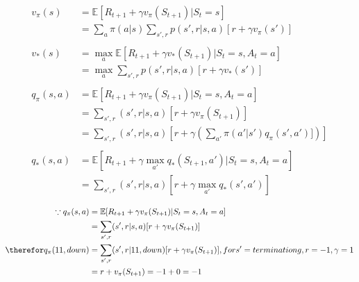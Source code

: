 \documentclass{article}
\begin{document}
\[
  \begin{aligned}
  v_{\pi}(s) &= \mathbb{E}[R_{t+1} + \gamma v_{\pi}(S_{t+1}) | S_{t}=s] \\
  &= \sum_{a}\pi(a|s) \sum_{s',r}p(s',r|s,a)[r + \gamma v_{\pi}(s')]\\
  \\
  v_{*}(s) &= \max_{a}\mathbb{E}[R_{t+1} + \gamma v_{*}(S_{t+1}) | S_{t}=s, A_{t}=a]\\
  &= \max_{a}\sum_{s',r}p(s',r|s,a)[r + \gamma v_{*}(s')]\\
  \\
  q_{\pi}(s,a) &= \mathbb{E}[R_{t+1} + \gamma v_{\pi}(S_{t+1}) | S_{t}=s, A_{t}=a]\\
  &= \sum_{s',r}(s',r|s,a)[r + \gamma v_{\pi}(S_{t+1})]\\
  &= \sum_{s',r}(s',r|s,a)[r + \gamma (\sum_{a'}\pi(a'|s') q_{\pi}(s',a')])]\\
  \\
  q_{*}(s,a) &= \mathbb{E}[R_{t+1} + \gamma \max_{a'}q_{*}(S_{t+1}, a') | S_{t}=s, A_{t}=a]\\
  &= \sum_{s',r}(s',r|s,a)[r + \gamma \max_{a'}q_{*}(s', a')]
  \end{aligned}
\]

\[
  \begin{aligned}
    \because q_{\pi}(s,a) &= \mathbb{E}[R_{t+1} + \gamma v_{\pi}(S_{t+1}) | S_{t}=s, A_{t}=a]\\
    &= \sum_{s',r}(s',r|s,a)[r + \gamma v_{\pi}(S_{t+1})]\\
    \therefor q_{\pi}(11,down) &= \sum_{s',r}(s',r|11,down)[r + \gamma v_{\pi}(S_{t+1})], for s'=terminationg, r=-1, \gamma = 1\\
    &= r + v_{\pi}(S_{t+1}) = -1 + 0 = -1
    
  \end{aligned}
\]
\end{document}
